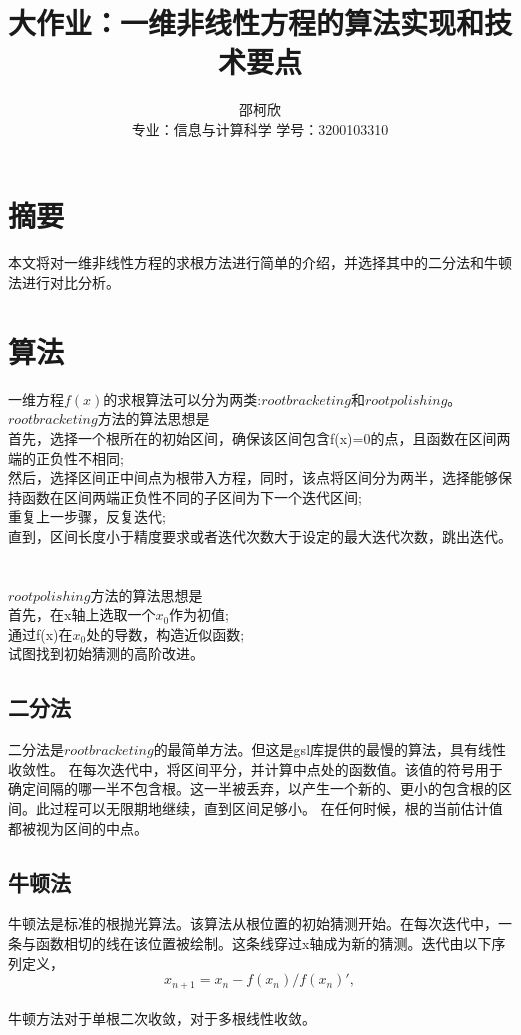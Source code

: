 \documentclass{ctexart}
\title{大作业：一维非线性方程的算法实现和技术要点}
\author{邵柯欣 \\ 专业：信息与计算科学 学号：3200103310}
\begin{document}
\maketitle

\section{摘要}
本文将对一维非线性方程的求根方法进行简单的介绍，并选择其中的二分法和牛顿法进行对比分析。
\section{算法}
一维方程$f(x)$的求根算法可以分为两类:$root bracketing$和$root polishing$\cite{daahjhudp1985}。
\\$root bracketing$方法的算法思想是\cite{acms2022}
\\首先，选择一个根所在的初始区间，确保该区间包含f(x)=0的点，且函数在区间两端的正负性不相同;
\\然后，选择区间正中间点为根带入方程，同时，该点将区间分为两半，选择能够保持函数在区间两端正负性不同的子区间为下一个迭代区间;
\\重复上一步骤，反复迭代;
\\直到，区间长度小于精度要求或者迭代次数大于设定的最大迭代次数，跳出迭代。
~\\
\\$root polishing$方法的算法思想是
\\首先，在x轴上选取一个$x_0$作为初值;
\\通过f(x)在$x_0$处的导数，构造近似函数;
\\试图找到初始猜测的高阶改进。

\subsection{二分法}

二分法是$root bracketing$的最简单方法。但这是gsl库提供的最慢的算法，具有线性收敛性。
在每次迭代中，将区间平分，并计算中点处的函数值。该值的符号用于确定间隔的哪一半不包含根。这一半被丢弃，以产生一个新的、更小的包含根的区间。此过程可以无限期地继续，直到区间足够小。
在任何时候，根的当前估计值都被视为区间的中点。

\subsection{牛顿法}

牛顿法是标准的根抛光算法。该算法从根位置的初始猜测开始。在每次迭代中，一条与函数相切的线在该位置被绘制。这条线穿过x轴成为新的猜测。\cite{PMSAJoP2018}迭代由以下序列定义，
\begin{equation}
  x_{n+1} = x_n-f(x_n)/f(x_n)',
\end{equation}
\\牛顿方法对于单根二次收敛，对于多根线性收敛。
\end{document}
